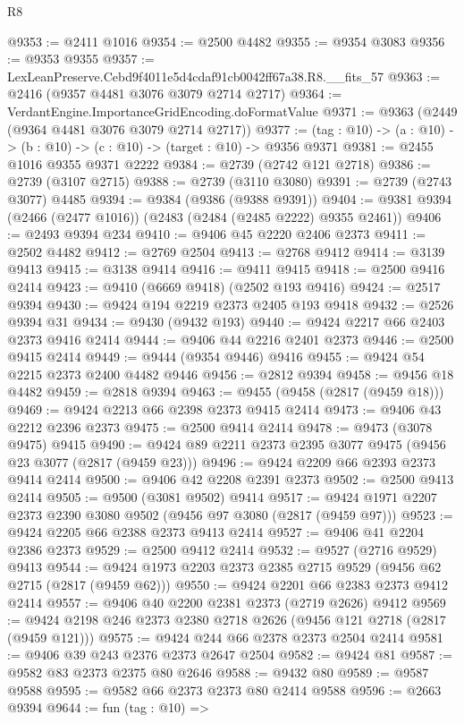 \begin{lexlean}{R8}
\begin{coremodule}
@9353 := @2411 @1016
@9354 := @2500 @4482
@9355 := @9354 @3083
@9356 := @9353 @9355
@9357 := LexLeanPreserve.Cebd9f4011e5d4cdaf91cb0042ff67a38.R8.__fits_57
@9363 := @2416 (@9357 @4481 @3076 @3079 @2714 @2717)
@9364 := VerdantEngine.ImportanceGridEncoding.doFormatValue
@9371 := @9363 (@2449 (@9364 @4481 @3076 @3079 @2714 @2717))
@9377 := (tag : @10) -> (a : @10) -> (b : @10) -> (c : @10) -> (target : @10) -> @9356 @9371
@9381 := @2455 @1016 @9355 @9371 @2222
@9384 := @2739 (@2742 @121 @2718)
@9386 := @2739 (@3107 @2715)
@9388 := @2739 (@3110 @3080)
@9391 := @2739 (@2743 @3077) @4485
@9394 := @9384 (@9386 (@9388 @9391))
@9404 := @9381 @9394 (@2466 (@2477 @1016)) (@2483 (@2484 (@2485 @2222) @9355 @2461))
@9406 := @2493 @9394 @234
@9410 := @9406 @45 @2220 @2406 @2373
@9411 := @2502 @4482
@9412 := @2769 @2504
@9413 := @2768 @9412
@9414 := @3139 @9413
@9415 := @3138 @9414
@9416 := @9411 @9415
@9418 := @2500 @9416 @2414
@9423 := @9410 (@6669 @9418) (@2502 @193 @9416)
@9424 := @2517 @9394
@9430 := @9424 @194 @2219 @2373 @2405 @193 @9418
@9432 := @2526 @9394 @31
@9434 := @9430 (@9432 @193)
@9440 := @9424 @2217 @66 @2403 @2373 @9416 @2414
@9444 := @9406 @44 @2216 @2401 @2373
@9446 := @2500 @9415 @2414
@9449 := @9444 (@9354 @9446) @9416
@9455 := @9424 @54 @2215 @2373 @2400 @4482 @9446
@9456 := @2812 @9394
@9458 := @9456 @18 @4482
@9459 := @2818 @9394
@9463 := @9455 (@9458 (@2817 (@9459 @18)))
@9469 := @9424 @2213 @66 @2398 @2373 @9415 @2414
@9473 := @9406 @43 @2212 @2396 @2373
@9475 := @2500 @9414 @2414
@9478 := @9473 (@3078 @9475) @9415
@9490 := @9424 @89 @2211 @2373 @2395 @3077 @9475 (@9456 @23 @3077 (@2817 (@9459 @23)))
@9496 := @9424 @2209 @66 @2393 @2373 @9414 @2414
@9500 := @9406 @42 @2208 @2391 @2373
@9502 := @2500 @9413 @2414
@9505 := @9500 (@3081 @9502) @9414
@9517 := @9424 @1971 @2207 @2373 @2390 @3080 @9502 (@9456 @97 @3080 (@2817 (@9459 @97)))
@9523 := @9424 @2205 @66 @2388 @2373 @9413 @2414
@9527 := @9406 @41 @2204 @2386 @2373
@9529 := @2500 @9412 @2414
@9532 := @9527 (@2716 @9529) @9413
@9544 := @9424 @1973 @2203 @2373 @2385 @2715 @9529 (@9456 @62 @2715 (@2817 (@9459 @62)))
@9550 := @9424 @2201 @66 @2383 @2373 @9412 @2414
@9557 := @9406 @40 @2200 @2381 @2373 (@2719 @2626) @9412
@9569 := @9424 @2198 @246 @2373 @2380 @2718 @2626 (@9456 @121 @2718 (@2817 (@9459 @121)))
@9575 := @9424 @244 @66 @2378 @2373 @2504 @2414
@9581 := @9406 @39 @243 @2376 @2373 @2647 @2504
@9582 := @9424 @81
@9587 := @9582 @83 @2373 @2375 @80 @2646
@9588 := @9432 @80
@9589 := @9587 @9588
@9595 := @9582 @66 @2373 @2373 @80 @2414 @9588
@9596 := @2663 @9394
@9644 := fun (tag : @10) =>

\end{coremodule}
\end{lexlean}
